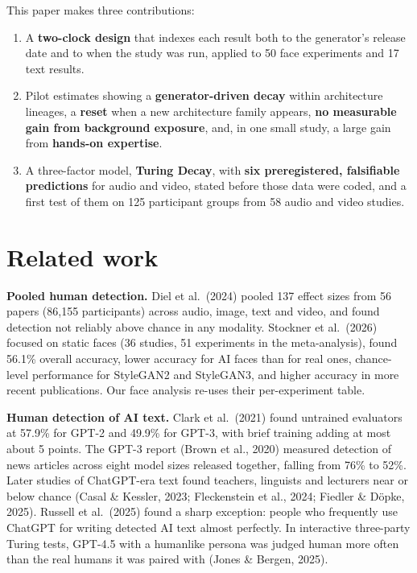\documentclass[11pt]{article}
\providecommand{\tightlist}{\setlength{\itemsep}{0pt}\setlength{\parskip}{0pt}}
\begin{document}
This paper makes three contributions:

\begin{enumerate}
\def\labelenumi{\arabic{enumi}.}
\tightlist
\item
  A \textbf{two-clock design} that indexes each result both to the
  generator's release date and to when the study was run, applied to 50
  face experiments and 17 text results.
\item
  Pilot estimates showing a \textbf{generator-driven decay} within
  architecture lineages, a \textbf{reset} when a new architecture family
  appears, \textbf{no measurable gain from background exposure}, and, in
  one small study, a large gain from \textbf{hands-on expertise}.
\item
  A three-factor model, \textbf{Turing Decay}, with \textbf{six
  preregistered, falsifiable predictions} for audio and video, stated
  before those data were coded, and a first test of them on 125
  participant groups from 58 audio and video studies.
\end{enumerate}

\hypertarget{related-work}{%
\section{Related work}\label{related-work}}

\textbf{Pooled human detection.} Diel et al.~(2024) pooled 137 effect
sizes from 56 papers (86,155 participants) across audio, image, text and
video, and found detection not reliably above chance in any modality.
Stockner et al.~(2026) focused on static faces (36 studies, 51
experiments in the meta-analysis), found 56.1\% overall accuracy, lower
accuracy for AI faces than for real ones, chance-level performance for
StyleGAN2 and StyleGAN3, and higher accuracy in more recent
publications. Our face analysis re-uses their per-experiment table.

\textbf{Human detection of AI text.} Clark et al.~(2021) found untrained
evaluators at 57.9\% for GPT-2 and 49.9\% for GPT-3, with brief training
adding at most about 5 points. The GPT-3 report (Brown et al., 2020)
measured detection of news articles across eight model sizes released
together, falling from 76\% to 52\%. Later studies of ChatGPT-era text
found teachers, linguists and lecturers near or below chance (Casal \&
Kessler, 2023; Fleckenstein et al., 2024; Fiedler \& Döpke, 2025).
Russell et al.~(2025) found a sharp exception: people who frequently use
ChatGPT for writing detected AI text almost perfectly. In interactive
three-party Turing tests, GPT-4.5 with a humanlike persona was judged
human more often than the real humans it was paired with (Jones \&
Bergen, 2025).
\end{document}
